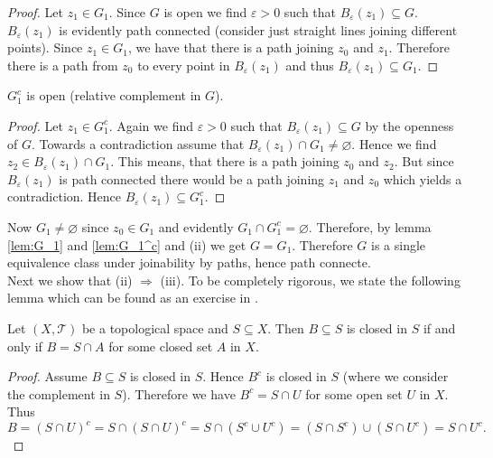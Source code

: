 \begin{enumerate}[label = \textbf{Exercise \arabic*.},wide = 0pt, itemsep=1.5ex]
	\begin{proof}
		Let $z_1 \in G_1$. Since $G$ is open we find $\varepsilon > 0$ such that $B_\varepsilon(z_1) \subseteq G$. $B_\varepsilon(z_1)$ is evidently path connected (consider just straight lines joining different points). Since $z_1 \in G_1$, we have that there is a path joining $z_0$ and $z_1$. Therefore there is a path from $z_0$ to every point in $B_\varepsilon(z_1)$ and thus $B_\varepsilon(z_1) \subseteq G_1$.
	\end{proof}

	\begin{mdframed}
		\begin{lemma}
			$G_1^c$ is open (relative complement in $G$).
			\label{lem:G_1^c}
		\end{lemma}
	\end{mdframed}

	\begin{proof}
	Let $z_1 \in G_1^c$. Again we find $\varepsilon > 0$ such that $B_\varepsilon(z_1) \subseteq G$ by the openness of $G$. Towards a contradiction assume that $B_\varepsilon(z_1) \cap G_1 \neq \varnothing$. Hence we find $z_2 \in B_\varepsilon(z_1) \cap G_1$. This means, that there is a path joining $z_0$ and $z_2$. But since $B_\varepsilon(z_1)$ is path connected there would be a path joining $z_1$ and $z_0$ which yields a contradiction. Hence $B_\varepsilon(z_1) \subseteq G_1^c$. 
\end{proof}

Now $G_1 \neq \varnothing$ since $z_0 \in G_1$ and evidently $G_1 \cap G_1^c = \varnothing$. Therefore, by lemma \ref{lem:G_1} and \ref{lem:G_1^c} and (ii) we get $G = G_1$. Therefore $G$ is a single equivalence class under joinability by paths, hence path connecte.\\
	Next we show that (ii) $\Rightarrow$ (iii). To be completely rigorous, we state the following lemma which can be found as an exercise in \cite[50]{lee:topological_manifolds:2011}.
	\begin{lemma}
		Let $(X,\mathcal{T})$ be a topological space and $S \subseteq X$. Then $B \subseteq S$ is closed in $S$ if and only if $B = S \cap A$ for some closed set $A$ in $X$.
		\label{lem:subspaceclosed}
	\end{lemma}

	\begin{proof}
		Assume $B \subseteq S$ is closed in $S$. Hence $B^c$ is closed in $S$ (where we consider the complement in $S$). Therefore we have $B^c = S \cap U$ for some open set $U$ in $X$. Thus
		\begin{equation*}
			B = (S \cap U)^c = S \cap (S \cap U)^c = S \cap (S^c \cup U^c) = (S \cap S^c) \cup (S \cap U^c) = S \cap U^c.
		\end{equation*}


\end{proof}
\end{enumerate}
